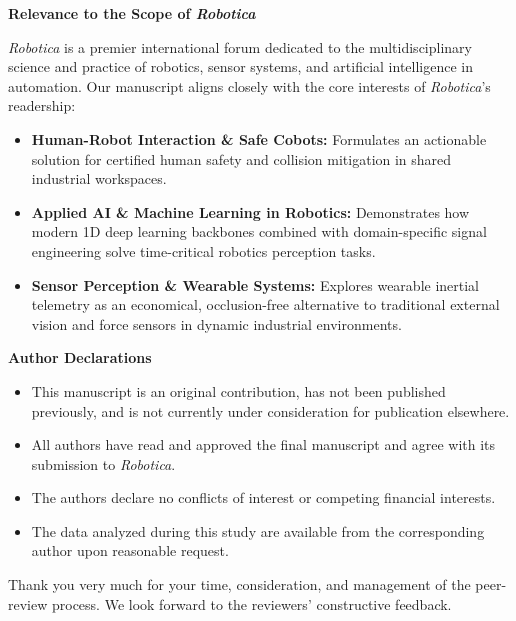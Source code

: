 \documentclass[11pt,a4paper]{article}
\begin{document}
\newpage

{\large\textbf{Relevance to the Scope of \textit{Robotica}}}\par\vspace{4pt}
\textit{Robotica} is a premier international forum dedicated to the multidisciplinary science and practice of robotics, sensor systems, and artificial intelligence in automation. Our manuscript aligns closely with the core interests of \textit{Robotica}'s readership:
\begin{itemize}[leftmargin=*,itemsep=3pt,topsep=2pt]
    \item \textbf{Human-Robot Interaction \& Safe Cobots:} Formulates an actionable solution for certified human safety and collision mitigation in shared industrial workspaces.
    \item \textbf{Applied AI \& Machine Learning in Robotics:} Demonstrates how modern 1D deep learning backbones combined with domain-specific signal engineering solve time-critical robotics perception tasks.
    \item \textbf{Sensor Perception \& Wearable Systems:} Explores wearable inertial telemetry as an economical, occlusion-free alternative to traditional external vision and force sensors in dynamic industrial environments.
\end{itemize}

\vspace{0.8em}
{\large\textbf{Author Declarations}}\par\vspace{4pt}
\begin{itemize}[leftmargin=*,itemsep=3pt,topsep=2pt]
    \item This manuscript is an original contribution, has not been published previously, and is not currently under consideration for publication elsewhere.
    \item All authors have read and approved the final manuscript and agree with its submission to \textit{Robotica}.
    \item The authors declare no conflicts of interest or competing financial interests.
    \item The data analyzed during this study are available from the corresponding author upon reasonable request.
\end{itemize}

\vspace{0.8em}
Thank you very much for your time, consideration, and management of the peer-review process. We look forward to the reviewers' constructive feedback.
\end{document}
